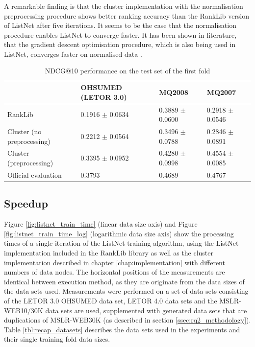 A remarkable finding is that the cluster implementation with the normalisation preprocessing procedure shows better ranking accuracy than the RankLib version of ListNet after five iterations. It seems to be the case that the normalisation procedure enables ListNet to converge faster. It has been shown in literature, that the gradient descent optimisation procedure, which is also being used in ListNet, converges faster on normalised data \cite{Ng1999}.

\begin{table}
\centering
\begin{tabular}{p{3.4cm}p{3.0cm}p{2.6cm}p{2.6cm}}\toprule
 &  OHSUMED  (LETOR 3.0) & MQ2008 & MQ2007 \\
\midrule
RankLib                             & 0.1916 $\pm$ 0.0634 & 0.3889 $\pm$ 0.0600 & 0.2918 $\pm$ 0.0546 \\
Cluster \newline (no preprocessing)	& 0.2212 $\pm$ 0.0564 & 0.3496 $\pm$ 0.0788 & 0.2846 $\pm$ 0.0891\\
Cluster \newline (preprocessing)    & 0.3395 $\pm$ 0.0952 & 0.4280 $\pm$ 0.0998 & 0.4554 $\pm$ 0.0085\\
Official evaluation                 & 0.3793 & 0.4689 & 0.4767 \\
\bottomrule
\end{tabular}
\caption{\acs{NDCG}@10 performance on the test set of the first fold}
\label{tbl:accuracy_comparison}
\end{table}

\subsection{Speedup}
\label{ssec:speedup}
Figure \ref{fig:listnet_train_time} (linear data size axis) and Figure \ref{fig:listnet_train_time_log} (logarithmic data size axis) show the processing times of a single iteration of the ListNet training algorithm, using the ListNet implementation included in the RankLib library as well as the cluster implementation described in chapter \ref{chap:implementation} with different numbers of data nodes. The horizontal positions of the measurements are identical between execution method, as they are originate from the data sizes of the data sets used. Measurements were performed on a set of data sets consisting of the LETOR 3.0 OHSUMED data set, LETOR 4.0 data sets and the MSLR-WEB10/30K data sets are used, supplemented with generated data sets that are duplications of MSLR-WEB30K (as described in section \ref{ssec:rq2_methodology}). Table \ref{tbl:recap_datasets} describes the data sets used in the experiments and their single training fold data sizes.\\

